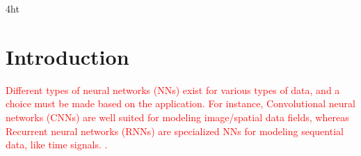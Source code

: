 \documentclass[
  a4paper,  %
  twoside,  %
  bibliography=totoc,
  headsepline,
  cleardoublepage=empty,
  parskip=half,
  draft=false
]{scrbook}
\begin{document}
\listoffigures
\listoftables

\ifdeutsch
\else
\fi

\ifdeutsch
\else
\fi

\printnoidxglossaries

\iftex4ht
\else
\fi



\renewcommand*{\chapterpagestyle}{scrplain}
\pagestyle{scrheadings}
\pagestyle{scrheadings}
\ihead[]{}
\chead[]{}
\ohead[]{\headmark}
\cfoot[]{}
\ifoot[]{}

































%
%



\chapter{Introduction}
\textcolor{red}{Different types of neural networks (NNs) exist for various types of data, and a choice must
be made based on the application. For instance, Convolutional neural networks (CNNs) are well
suited for modeling image/spatial data fields, whereas Recurrent neural networks (RNNs) are specialized NNs for modeling sequential data, like time signals. \cite{mohan2018deep}.}
\end{document}
